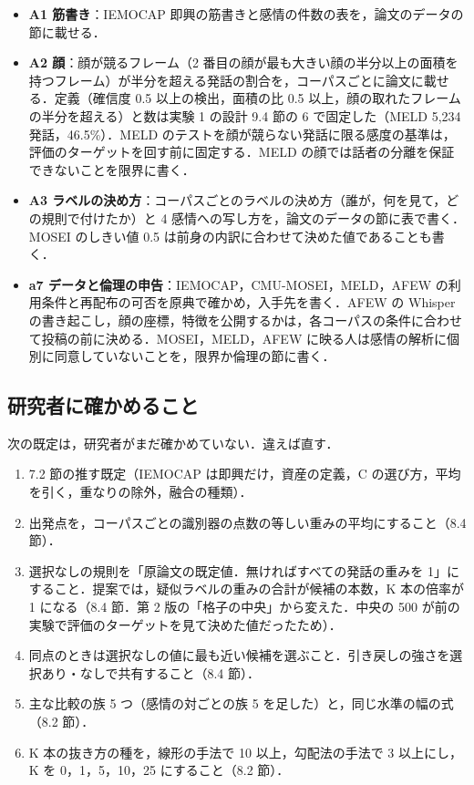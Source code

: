 \documentclass[11pt,a4paper]{ltjsarticle}
\begin{document}
\begin{itemize}
  \item \textbf{A1 筋書き}：IEMOCAP 即興の筋書きと感情の件数の表を，論文のデータの節に載せる．
  \item \textbf{A2 顔}：顔が競るフレーム（2 番目の顔が最も大きい顔の半分以上の面積を持つフレーム）が半分を超える発話の割合を，コーパスごとに論文に載せる．定義（確信度 0.5 以上の検出，面積の比 0.5 以上，顔の取れたフレームの半分を超える）と数は実験 1 の設計 9.4 節の 6 で固定した（MELD 5,234 発話，46.5\%）．MELD のテストを顔が競らない発話に限る感度の基準は，評価のターゲットを回す前に固定する．MELD の顔では話者の分離を保証できないことを限界に書く．
  \item \textbf{A3 ラベルの決め方}：コーパスごとのラベルの決め方（誰が，何を見て，どの規則で付けたか）と 4 感情への写し方を，論文のデータの節に表で書く．MOSEI のしきい値 0.5 は前身の内訳に合わせて決めた値であることも書く．
  \item \textbf{a7 データと倫理の申告}：IEMOCAP，CMU-MOSEI，MELD，AFEW の利用条件と再配布の可否を原典で確かめ，入手先を書く．AFEW の Whisper の書き起こし，顔の座標，特徴を公開するかは，各コーパスの条件に合わせて投稿の前に決める．MOSEI，MELD，AFEW に映る人は感情の解析に個別に同意していないことを，限界か倫理の節に書く．
\end{itemize}

\subsection{研究者に確かめること}

次の既定は，研究者がまだ確かめていない．違えば直す．
\begin{enumerate}
  \item 7.2 節の推す既定（IEMOCAP は即興だけ，資産の定義，C の選び方，平均を引く，重なりの除外，融合の種類）．
  \item 出発点を，コーパスごとの識別器の点数の等しい重みの平均にすること（8.4 節）．
  \item 選択なしの規則を「原論文の既定値．無ければすべての発話の重みを 1」にすること．提案では，疑似ラベルの重みの合計が候補の本数，K 本の倍率が 1 になる（8.4 節．第 2 版の「格子の中央」から変えた．中央の 500 が前の実験で評価のターゲットを見て決めた値だったため）．
  \item 同点のときは選択なしの値に最も近い候補を選ぶこと．引き戻しの強さを選択あり・なしで共有すること（8.4 節）．
  \item 主な比較の族 5 つ（感情の対ごとの族 5 を足した）と，同じ水準の幅の式（8.2 節）．
  \item K 本の抜き方の種を，線形の手法で 10 以上，勾配法の手法で 3 以上にし，K を 0，1，5，10，25 にすること（8.2 節）．
\end{enumerate}
\end{document}
